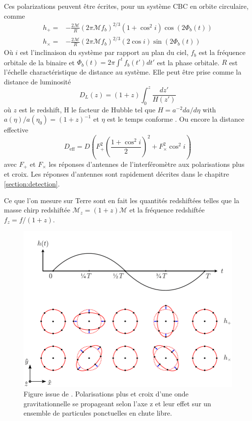 Ces polarizations peuvent être écrites, pour un système CBC en orbite circulaire, comme \cite{Will_2014}
%
\begin{equation}
  \begin{split}
    h_+ =& -\frac{2\mathcal{M}}{R} (2\pi \mathcal{M} f_b)^{2/3} (1+\cos^2 i) \cos(2\Phi_b (t))\\
    h_\times =& -\frac{2\mathcal{M}}{R} (2\pi \mathcal{M} f_b)^{2/3} (2\cos i) \sin(2\Phi_b (t))
  \end{split}
  \label{eq:polarization}
\end{equation}
%
Où $i$ est l'inclinaison du système par rapport au plan du ciel, $f_b$ est la fréquence orbitale de la binaire et $\Phi_b(t) = 2\pi \int^t f_b(t') dt'$ est la phase orbitale.
$R$ est l'échelle charactéristique de distance au système.
Elle peut être prise comme la distance de luminosité
\begin{equation}
  D_L(z) = (1+z) \int_0^z \frac{dz'}{H(z')}
  \label{eq:luminosity_distance}
\end{equation}
où $z$ est le redshift, H le facteur de Hubble tel que $H = a^{-2} da/d\eta$ with $a(\eta)/a(\eta_0) = (1+z)^{-1}$ et $\eta$ est le temps conforme \cite{luminosity_distance}.
Ou encore la distance effective \cite{findchirp}
\begin{equation}
  D_{\textrm{eff}} = D \left( F_+^2 \left(\frac{1+\cos^2i}{2}\right)^2 +F_\times^2 \cos^2i \right)
  \label{eq:effective_distance}
\end{equation}
avec $F_+$ et $F_\times$ les réponses d'antennes de l'interféromètre aux polarisations plus et croix.
Les réponses d'antennes sont rapidement décrites dans le chapitre \ref{section:detection}.

Ce que l'on mesure sur Terre sont en fait les quantités redshiftées telles que la masse chirp redshiftée $\mathcal{M}_z = (1+z) \mathcal{M}$ et la fréquence redshiftée $f_z = f/(1+z)$.

% 
\begin{figure}
  \centering
  \includegraphics[width=0.5\linewidth]{sectionGW/polarization.png}
  \caption{Figure issue de \cite{polarization_novak}. Polarisations plus et croix d'une onde gravitationnelle se propageant selon l'axe z et leur effet sur un ensemble de particules ponctuelles en chute libre.}
  \label{fig:polarization}
\end{figure}
%


